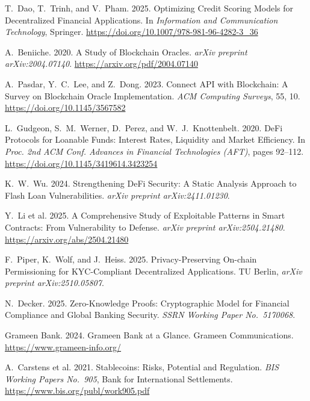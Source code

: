 \documentclass[12pt,a4paper]{report}
\begin{document}
{\begin{enumerate}[label={[\arabic*]}]
\item T.~Dao, T.~Trinh, and V.~Pham. 2025. Optimizing Credit Scoring Models for Decentralized Financial Applications. In \emph{Information and Communication Technology}, Springer. \url{https://doi.org/10.1007/978-981-96-4282-3_36}


\item A.~Beniiche. 2020. A Study of Blockchain Oracles. \emph{arXiv preprint arXiv:2004.07140}. \url{https://arxiv.org/pdf/2004.07140}


\item A.~Pasdar, Y.~C.~Lee, and Z.~Dong. 2023. Connect API with Blockchain: A Survey on Blockchain Oracle Implementation. \emph{ACM Computing Surveys}, 55, 10. \url{https://doi.org/10.1145/3567582}


\item L.~Gudgeon, S.~M.~Werner, D.~Perez, and W.~J.~Knottenbelt. 2020. DeFi Protocols for Loanable Funds: Interest Rates, Liquidity and Market Efficiency. In \emph{Proc. 2nd ACM Conf. Advances in Financial Technologies (AFT)}, pages 92--112. \url{https://doi.org/10.1145/3419614.3423254}


\item K.~W.~Wu. 2024. Strengthening DeFi Security: A Static Analysis Approach to Flash Loan Vulnerabilities. \emph{arXiv preprint arXiv:2411.01230}.


\item Y.~Li et al. 2025. A Comprehensive Study of Exploitable Patterns in Smart Contracts: From Vulnerability to Defense. \emph{arXiv preprint arXiv:2504.21480}. \url{https://arxiv.org/abs/2504.21480}


\item F.~Piper, K.~Wolf, and J.~Heiss. 2025. Privacy-Preserving On-chain Permissioning for KYC-Compliant Decentralized Applications. TU Berlin, \emph{arXiv preprint arXiv:2510.05807}.


\item N.~Decker. 2025. Zero-Knowledge Proofs: Cryptographic Model for Financial Compliance and Global Banking Security. \emph{SSRN Working Paper No.~5170068}.


\item Grameen Bank. 2024. Grameen Bank at a Glance. Grameen Communications. \url{https://www.grameen-info.org/}


\item A.~Carstens et al. 2021. Stablecoins: Risks, Potential and Regulation. \emph{BIS Working Papers No.~905}, Bank for International Settlements. \url{https://www.bis.org/publ/work905.pdf}



\end{enumerate}}
\end{document}

